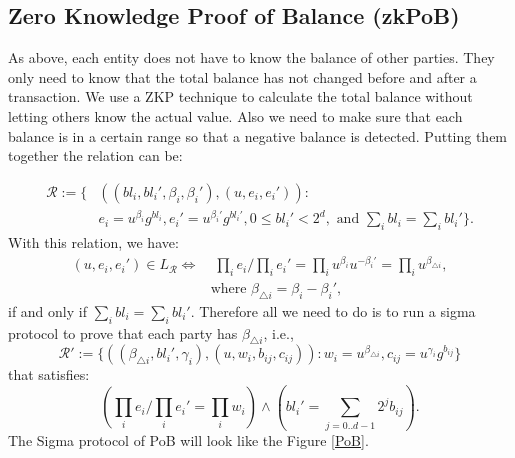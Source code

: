 \documentclass[10pt,fleqn]{article}
\begin{document}
\subsection{Zero Knowledge Proof of Balance (zkPoB)}
As above, each entity does not have to know the balance of other parties. They only need to know that the total balance has not changed before and after a transaction.  We use a ZKP technique to calculate the total balance without letting others know the actual value. Also we need to make sure that each balance is in a certain range so that a negative balance is detected. Putting them together the relation can be:

\[
\begin{split}
\mathcal{R} := \{& ((bl_i, bl_i', \beta_i, \beta_i'), (u, e_i, e_i')) : \\
& e_i = u^{\beta_i}g^{bl_i}, e_i' = u^{\beta_i'}g^{bl_i'}, 0 \le bl_i' < 2^d, \text{ and } \sum_i bl_i = \sum_i bl_i' \}.
\end{split}
\]
With this relation, we have:
\[
\begin{split}
(u, e_i, e_i') \in L_{\mathcal{R}} \Longleftrightarrow & \; \prod_i e_i / \prod_i e_i' = \prod_i u^{\beta_i} u^{-\beta_i'} = \prod_i u^{\beta_{\triangle
      i}}, \\ & \text{where } \beta_{\triangle i} = \beta_i - \beta_i',
\end{split}
\]
if and only if $\sum_i bl_i = \sum_i bl_i'$. Therefore all we need to
do is to run a sigma protocol to prove that each party has
$\beta_{\triangle i}$, i.e.,
\[
\mathcal{R}' := \{ ((\beta_{\triangle i}, bl_i', \gamma_i), (u, w_i, b_{ij}, c_{ij})) : w_i = u^{\beta_{\triangle i}}, c_{ij} = u^{\gamma_i} g^{b_{ij}} \}
\]
that satisfies:
\[
(\prod_i e_i / \prod_i e_i' = \prod_i w_i) \wedge (bl_i' = \sum_{j = 0..d-1} 2^{j} b_{ij}).
\]
The Sigma protocol of PoB will look like the Figure \ref{PoB}.
\end{document}
